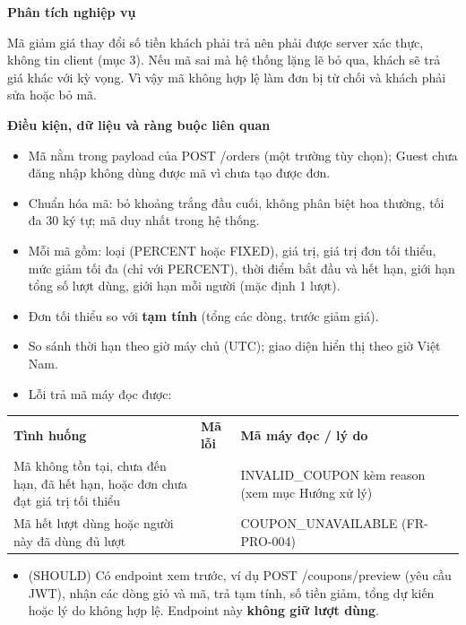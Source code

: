 \documentclass[11pt,a4paper,oneside]{report}
\begin{document}
\textbf{Phân tích nghiệp vụ}

Mã giảm giá thay đổi số tiền khách phải trả nên phải được server xác thực, không tin client (mục 3). Nếu mã sai mà hệ thống lặng lẽ bỏ qua, khách sẽ trả giá khác với kỳ vọng. Vì vậy mã không hợp lệ làm đơn bị từ chối và khách phải sửa hoặc bỏ mã.

\textbf{Điều kiện, dữ liệu và ràng buộc liên quan}

\begin{itemize}
\item
  Mã nằm trong payload của POST /orders (một trường tùy chọn); Guest chưa đăng nhập không dùng được mã vì chưa tạo được đơn.
\item
  Chuẩn hóa mã: bỏ khoảng trắng đầu cuối, không phân biệt hoa thường, tối đa 30 ký tự; mã duy nhất trong hệ thống.
\item
  Mỗi mã gồm: loại (PERCENT hoặc FIXED), giá trị, giá trị đơn tối thiểu, mức giảm tối đa (chỉ với PERCENT), thời điểm bắt đầu và hết hạn, giới hạn tổng số lượt dùng, giới hạn mỗi người (mặc định 1 lượt).
\item
  Đơn tối thiểu so với \textbf{tạm tính} (tổng các dòng, trước giảm giá).
\item
  So sánh thời hạn theo giờ máy chủ (UTC); giao diện hiển thị theo giờ Việt Nam.
\item
  Lỗi trả mã máy đọc được:
\end{itemize}

\begin{longtable}[]{@{}
  >{\raggedright\arraybackslash}p{}
  >{\raggedright\arraybackslash}p{}
  >{\raggedright\arraybackslash}p{}@{}}
\toprule\noalign{}
\endhead
\bottomrule\noalign{}
\endlastfoot
\textbf{Tình huống} & \textbf{Mã lỗi} & \textbf{Mã máy đọc / lý do} \\
Mã không tồn tại, chưa đến hạn, đã hết hạn, hoặc đơn chưa đạt giá trị tối thiểu & 400 & INVALID\_COUPON kèm reason (xem mục Hướng xử lý) \\
Mã hết lượt dùng hoặc người này đã dùng đủ lượt & 409 & COUPON\_UNAVAILABLE (FR-PRO-004) \\
\end{longtable}

\begin{itemize}
\item
  (SHOULD) Có endpoint xem trước, ví dụ POST /coupons/preview (yêu cầu JWT), nhận các dòng giỏ và mã, trả tạm tính, số tiền giảm, tổng dự kiến hoặc lý do không hợp lệ. Endpoint này \textbf{không giữ lượt dùng}.
\end{itemize}
\end{document}
